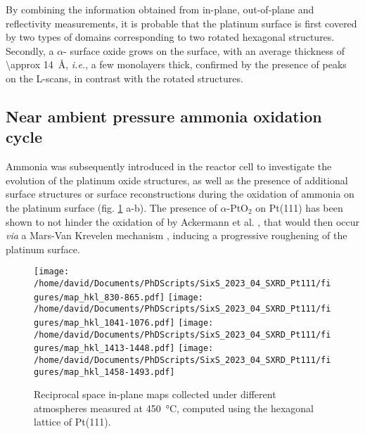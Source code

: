 By combining the information obtained from in-plane, out-of-plane and reflectivity measurements, it is probable that the platinum surface is first covered by two types of domains corresponding to two rotated hexagonal structures.
Secondly, a $\alpha$- surface oxide grows on the surface, with an average thickness of \qty{\approx 14}{\angstrom}, \textit{i.e.}, a few monolayers thick, confirmed by the presence of peaks on the L-scans, in contrast with the rotated structures.


\subsection{Near ambient pressure ammonia oxidation cycle}

Ammonia was subsequently introduced in the reactor cell to investigate the evolution of the platinum oxide structures, as well as the presence of additional surface structures or surface reconstructions during the oxidation of ammonia on the platinum surface (fig. \ref{fig:MapsPt111B} a-b).
The presence of $\alpha$-PtO$_2$ on Pt(111) has been shown to not hinder the oxidation of  by Ackermann et al. \parencite*{Ackermann2007}, that would then occur \textit{via} a Mars-Van Krevelen mechanism \parencite{Mars1954}, inducing a progressive roughening of the platinum surface.

\begin{figure}[!htb]
    \centering
    \texttt{[image: /home/david/Documents/PhDScripts/SixS\_2023\_04\_SXRD\_Pt111/figures/map\_hkl\_830-865.pdf]}
    \texttt{[image: /home/david/Documents/PhDScripts/SixS\_2023\_04\_SXRD\_Pt111/figures/map\_hkl\_1041-1076.pdf]}
    \texttt{[image: /home/david/Documents/PhDScripts/SixS\_2023\_04\_SXRD\_Pt111/figures/map\_hkl\_1413-1448.pdf]}
    \texttt{[image: /home/david/Documents/PhDScripts/SixS\_2023\_04\_SXRD\_Pt111/figures/map\_hkl\_1458-1493.pdf]}
    \caption{
        Reciprocal space in-plane maps collected under different atmospheres measured at \qty{450}{\degreeCelsius}, computed using the hexagonal lattice of Pt(111).
    }
    \label{fig:MapsPt111B}
\end{figure}

